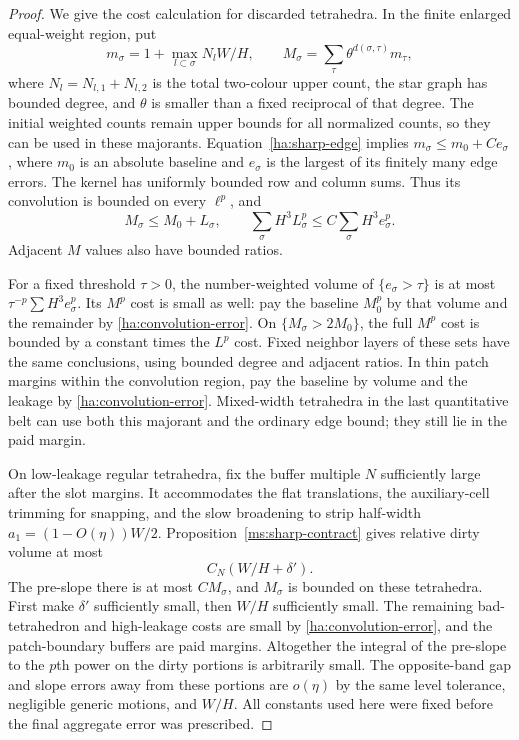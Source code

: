 \begin{proof}
We give the cost calculation for discarded tetrahedra.  In the
finite enlarged equal-weight region, put
\[
 m_\sigma=1+\max_{l\subset\sigma}N_lW/H,
 \qquad
 M_\sigma=\sum_{\tau}\theta^{d(\sigma,\tau)}m_\tau,
\]
where $N_l=N_{l,1}+N_{l,2}$ is the total two-colour upper count,
the star graph has bounded degree, and $\theta$ is smaller
than a fixed reciprocal of that degree.  The initial weighted
counts remain upper bounds for all normalized counts, so they can
be used in these majorants.  Equation~\eqref{ha:sharp-edge} implies
$m_\sigma\le m_0+C e_\sigma$, where $m_0$ is an absolute baseline
and $e_\sigma$ is the largest of its finitely many edge errors.
The kernel has uniformly bounded row and column sums.  Thus its
convolution is bounded on every $\ell^p$, and
\begin{equation}\label{ha:convolution-error}
 M_\sigma\le M_0+L_\sigma,
 \qquad
 \sum_\sigma H^3L_\sigma^p
       \le C\sum_\sigma H^3e_\sigma^p.
\end{equation}
Adjacent $M$ values also have bounded ratios.

For a fixed threshold $\tau>0$, the number-weighted volume of
$\{e_\sigma>\tau\}$ is at most
$\tau^{-p}\sum H^3e_\sigma^p$.  Its $M^p$ cost is small as well:
pay the baseline $M_0^p$ by that volume and the remainder by
\eqref{ha:convolution-error}.  On $\{M_\sigma>2M_0\}$, the full
$M^p$ cost is bounded by a constant times the $L^p$ cost.  Fixed
neighbor layers of these sets have the same conclusions, using
bounded degree and adjacent ratios.  In thin patch margins within
the convolution region, pay the baseline by volume and the leakage
by \eqref{ha:convolution-error}.  Mixed-width tetrahedra in the last
quantitative belt can use both this majorant and the ordinary edge
bound; they still lie in the paid margin.

On low-leakage regular tetrahedra, fix the buffer multiple $N$
sufficiently large after the slot margins.  It accommodates the
flat translations, the auxiliary-cell trimming for snapping, and
the slow broadening to strip half-width
$a_1=(1-O(\eta))W/2$.  Proposition~\ref{ms:sharp-contract} gives
relative dirty volume at most
\begin{equation}\label{ha:dirty-fraction}
                           C_N(W/H+\delta').
\end{equation}
The pre-slope there is at most $CM_\sigma$, and $M_\sigma$ is
bounded on these tetrahedra.  First make $\delta'$ sufficiently
small, then $W/H$ sufficiently small.  The remaining bad-tetrahedron
and high-leakage costs are small by
\eqref{ha:convolution-error}, and the patch-boundary buffers are
paid margins.  Altogether the integral of the pre-slope to the
$p$th power on the dirty portions is arbitrarily small.  The
opposite-band gap and slope errors away from these portions are
$o(\eta)$ by the same level tolerance, negligible generic motions,
and $W/H$.  All constants used here were fixed before the final
aggregate error was prescribed.
\end{proof}

